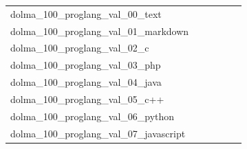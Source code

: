 \documentclass[dvipsnames]{article}
\begin{document}
\begin{appendix}
{\begin{longtable}{m{6cm}m{1.7cm}m{1.7cm}m{1.7cm}m{1.7cm}m{1.7cm}}
	dolma\_100\_proglang\_val\_00\_text  & \colorbox[HTML]{77c578}{\makebox[\mywidth][c]{5.61}} & \colorbox[HTML]{fefee0}{\makebox[\mywidth][c]{6.30}} & \colorbox[HTML]{ffffe5}{\makebox[\mywidth][c]{6.94}} & \colorbox[HTML]{a4d98a}{\makebox[\mywidth][c]{5.67}} & \colorbox[HTML]{afdd8f}{\makebox[\mywidth][c]{5.69}}\\
	dolma\_100\_proglang\_val\_01\_markdown  & \colorbox[HTML]{ccea9c}{\makebox[\mywidth][c]{3.16}} & \colorbox[HTML]{d0ec9e}{\makebox[\mywidth][c]{3.16}} & \colorbox[HTML]{ffffe5}{\makebox[\mywidth][c]{3.56}} & \colorbox[HTML]{bde395}{\makebox[\mywidth][c]{3.15}} & \colorbox[HTML]{77c578}{\makebox[\mywidth][c]{3.11}}\\
	dolma\_100\_proglang\_val\_02\_c  & \colorbox[HTML]{77c578}{\makebox[\mywidth][c]{1.84}} & \colorbox[HTML]{ebf7b0}{\makebox[\mywidth][c]{1.91}} & \colorbox[HTML]{ffffe5}{\makebox[\mywidth][c]{2.23}} & \colorbox[HTML]{b8e293}{\makebox[\mywidth][c]{1.86}} & \colorbox[HTML]{9dd687}{\makebox[\mywidth][c]{1.85}}\\
	dolma\_100\_proglang\_val\_03\_php  & \colorbox[HTML]{f3fab6}{\makebox[\mywidth][c]{1.75}} & \colorbox[HTML]{f7fcba}{\makebox[\mywidth][c]{1.75}} & \colorbox[HTML]{ffffe5}{\makebox[\mywidth][c]{1.83}} & \colorbox[HTML]{b4e091}{\makebox[\mywidth][c]{1.73}} & \colorbox[HTML]{77c578}{\makebox[\mywidth][c]{1.72}}\\
	dolma\_100\_proglang\_val\_04\_java  & \colorbox[HTML]{a9db8c}{\makebox[\mywidth][c]{1.96}} & \colorbox[HTML]{e2f3a9}{\makebox[\mywidth][c]{1.99}} & \colorbox[HTML]{ffffe5}{\makebox[\mywidth][c]{2.18}} & \colorbox[HTML]{77c578}{\makebox[\mywidth][c]{1.95}} & \colorbox[HTML]{7ac779}{\makebox[\mywidth][c]{1.95}}\\
	dolma\_100\_proglang\_val\_05\_c++  & \colorbox[HTML]{77c578}{\makebox[\mywidth][c]{2.19}} & \colorbox[HTML]{e8f6ae}{\makebox[\mywidth][c]{2.25}} & \colorbox[HTML]{ffffe5}{\makebox[\mywidth][c]{2.53}} & \colorbox[HTML]{afdd8f}{\makebox[\mywidth][c]{2.21}} & \colorbox[HTML]{89cd7f}{\makebox[\mywidth][c]{2.19}}\\
	dolma\_100\_proglang\_val\_06\_python  & \colorbox[HTML]{96d385}{\makebox[\mywidth][c]{2.35}} & \colorbox[HTML]{e4f4ab}{\makebox[\mywidth][c]{2.39}} & \colorbox[HTML]{ffffe5}{\makebox[\mywidth][c]{2.62}} & \colorbox[HTML]{addd8e}{\makebox[\mywidth][c]{2.36}} & \colorbox[HTML]{77c578}{\makebox[\mywidth][c]{2.34}}\\
	dolma\_100\_proglang\_val\_07\_javascript  & \colorbox[HTML]{9fd688}{\makebox[\mywidth][c]{2.54}} & \colorbox[HTML]{ebf7b0}{\makebox[\mywidth][c]{2.59}} & \colorbox[HTML]{ffffe5}{\makebox[\mywidth][c]{2.83}} & \colorbox[HTML]{77c578}{\makebox[\mywidth][c]{2.53}} & \colorbox[HTML]{78c679}{\makebox[\mywidth][c]{2.53}}\\

\end{longtable}}
\end{appendix}
\end{document}
